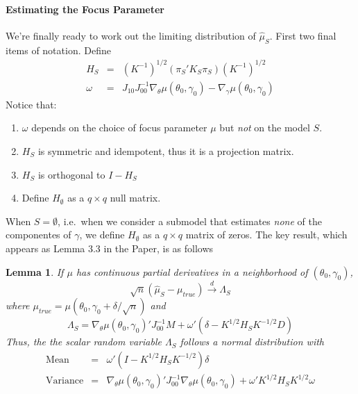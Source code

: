 \documentclass[12pt]{article}
\newtheorem{lem}{Lemma}
\theoremstyle{definition}
\begin{document}
\paragraph{Estimating the Focus Parameter} We're finally ready to work out the limiting distribution of $\widehat{\mu}_S$. First two final items of notation. Define
	\begin{eqnarray*}
		H_S &=& \left(K^{-1}\right)^{1/2}(\pi_S' K_S \pi_S) \left( K^{-1} \right)^{1/2} \\
		\omega &=&  J_{10}J_{00}^{-1} \nabla_\theta \mu(\theta_0,\gamma_0) - \nabla_\gamma \mu(\theta_0, \gamma_0)
	\end{eqnarray*}
Notice that:
	\begin{enumerate}
		\item $\omega$ depends on the choice of focus parameter $\mu$ but \emph{not} on the model $S$.
		\item $H_S$ is symmetric and idempotent, thus it is a projection matrix.
		\item $H_S$ is orthogonal to $I - H_S$
		\item Define $H_{\emptyset}$ as a $q\times q$ null matrix.
\end{enumerate}
When $S = \emptyset$, i.e.\ when we consider a submodel that estimates \emph{none} of the componentes of $\gamma$, we define $H_\emptyset$ as a $q\times q$ matrix of zeros. The key result, which appears as Lemma 3.3 in the Paper, is as follows
\begin{lem}
\label{lem:mu}
If $\mu$ has continuous partial derivatives in a neighborhood of $(\theta_0, \gamma_0)$,
	$$
	\sqrt{n}\left( \hat{\mu}_S - \mu_{true} \right) \overset{d}{\rightarrow} \Lambda_S
$$
where $\mu_{true} = \mu(\theta_0, \gamma_0+\delta/\sqrt{n})$ and 
	$$
	\Lambda_S = \nabla_\theta \mu(\theta_0, \gamma_0)' J_{00}^{-1} M + \omega'\left( \delta - K^{1/2}H_S K^{-1/2}D\right)
$$
Thus, the the scalar random variable $\Lambda_S$ follows a normal distribution with
	\begin{eqnarray*}
		\mbox{Mean}&=&\omega'(I - K^{1/2}H_SK^{-1/2})\delta\\
		\mbox{Variance}&=&\nabla_\theta \mu(\theta_0, \gamma_0)'J_{00}^{-1}\nabla_\theta \mu(\theta_0, \gamma_0) + \omega'K^{1/2}H_S K^{1/2}\omega
	\end{eqnarray*}	
\end{lem}
\end{document}
